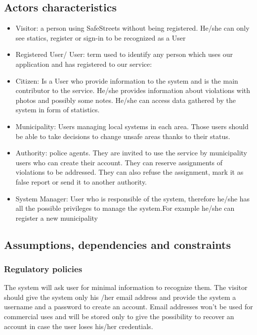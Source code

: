 \subsection{Actors characteristics}
\begin{itemize}
\item Visitor: a person using SafeStreets without being registered. He/she can only see statics, register or sign-in to be recognized as a User
\item Registered User/ User: term used to identify any person which uses our application and has registered to our service:
\item  Citizen: Is a User who provide information to the system and is the main contributor to the service.
He/she provides information about violations with photos and possibly some notes. He/she can access data gathered by the system in form of statistics.
\item Municipality: Users managing local systems in each area. Those users should be able to take decisions to change unsafe areas thanks to their status.
\item Authority: police agents. They are invited to use the service by municipality users who can create their account. They can reserve assignments of violations to be addressed. They can also refuse the assignment, mark it as false report or send it to another authority.
\item System Manager: User who is responsible of the system, therefore he/she has all the possible privileges to manage the system.For example he/she can register a new municipality
\end{itemize}
\subsection{Assumptions, dependencies and constraints}
\subsubsection {Regulatory policies}
The system will ask user for minimal information to recognize them. The visitor should give the system only his /her email address and provide the system a username and a password to create an account. Email addresses won’t be used for commercial uses and will be stored only to give the possibility to recover an account in case the user loses his/her credentials.
